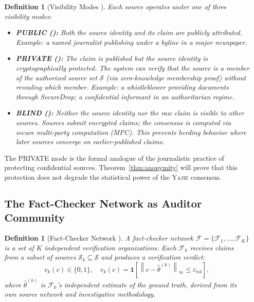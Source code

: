 \documentclass[11pt,a4paper]{article}
\newtheorem{definition}[theorem]{Definition}
\theoremstyle{definition}
\newcommand{\Yajie}{\textsc{Yajie}}
\newcommand{\ind}[1]{\mathbf{1}[#1]}
\newcommand{\norm}[1]{\left\lVert#1\right\rVert}
\newcommand{\cF}{\mathcal{F}}
\newcommand{\sourceSet}{\mathcal{S}}
\newcommand{\VISpublic}{\textsc{PUBLIC}}
\newcommand{\VISprivate}{\textsc{PRIVATE}}
\newcommand{\VISblind}{\textsc{BLIND}}
\begin{document}
\begin{definition}[Visibility Modes ]
\label{def:visibility}
Each source operates under one of three visibility modes:
\begin{itemize}
    \item \textbf{\VISpublic{} ():} Both the source identity and its claim are publicly attributed. Example: a named journalist publishing under a byline in a major newspaper.
    \item \textbf{\VISprivate{} ():} The claim is published but the source identity is cryptographically protected. The system can verify that the source is a member of the authorized source set $\sourceSet$ (via zero-knowledge membership proof) without revealing which member. Example: a whistleblower providing documents through SecureDrop; a confidential informant in an authoritarian regime.
    \item \textbf{\VISblind{} ():} Neither the source identity nor the raw claim is visible to other sources. Sources submit encrypted claims; the consensus is computed via secure multi-party computation (MPC). This prevents herding behavior where later sources converge on earlier-published claims.
\end{itemize}
\end{definition}

The \VISprivate{} mode is the formal analogue of the journalistic practice of protecting confidential sources. Theorem~\ref{thm:anonymity} will prove that this protection does not degrade the statistical power of the \Yajie{} consensus.

\subsection{The Fact-Checker Network as Auditor Community }

\begin{definition}[Fact-Checker Network ]
\label{def:factchecker_network}
A fact-checker network $\cF = \{\mathcal{F}_1, \ldots, \mathcal{F}_K\}$ is a set of $K$ independent verification organizations. Each $\mathcal{F}_k$ receives claims from a subset of sources $\sourceSet_k \subseteq \sourceSet$ and produces a verification verdict:
\begin{equation}
    v_k(c) \in \{0, 1\}, \quad v_k(c) = \ind{\norm{c - \hat{\theta}^{(k)}}_\infty \leq \varepsilon_{\mathrm{tol}}},
    \label{eq:verdict}
\end{equation}
where $\hat{\theta}^{(k)}$ is $\mathcal{F}_k$'s independent estimate of the ground truth, derived from its own source network and investigative methodology.
\end{definition}
\end{document}
